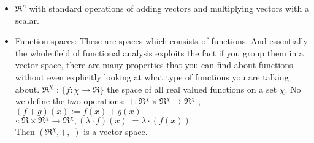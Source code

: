 	\begin{itemize}
		
		\item $\Re^n$ with standard operations of adding vectors and multiplying vectors with a scalar. 
		\item Function spaces: These are spaces which consists of functions. And essentially the whole field of functional analysis exploits the fact if you group them in a vector space, there are many properties that you can find about functions without even explicitly looking at what type of functions you are talking about. 
		\subitem $\Re^\chi$ : $\{f: \chi \rightarrow \Re\}$ the space of all real valued functions on a set $\chi$. No we define the two operations: 
		\subitem $ + : \Re^\chi \times \Re^\chi \rightarrow \Re^\chi$ , $(f + g)(x) := f(x) + g(x)$
		\subitem $\cdot : \Re \times \Re^\chi \rightarrow \Re^\chi, (\lambda \cdot f)(x) := \lambda \cdot (f(x))$ \\
		Then $(\Re^\chi, +, \cdot)$ is a vector space.
	\end{itemize}
